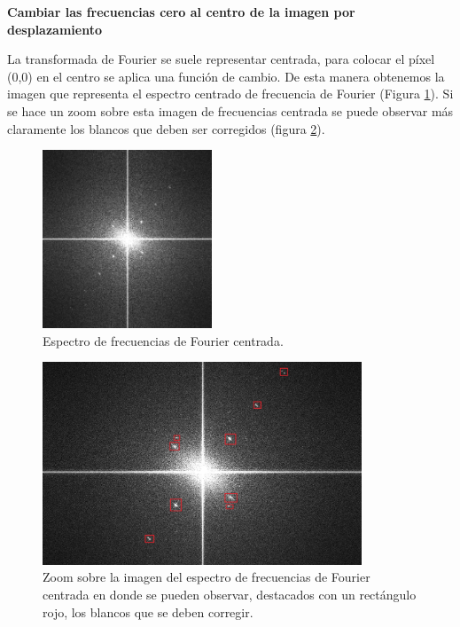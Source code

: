 \documentclass[10pt,a4paper, twoside]{report}
\begin{document}
\textbf{Cambiar las frecuencias cero al centro de la imagen por desplazamiento}

La transformada de Fourier se suele representar centrada, para colocar el píxel (0,0) en el centro se aplica una función de cambio. De esta manera obtenemos la imagen que representa el espectro centrado de frecuencia de Fourier (Figura \ref{FourierTransform}). Si se hace un zoom sobre esta imagen de frecuencias centrada se puede observar más claramente los blancos que deben ser corregidos (figura \ref{ZoomFourierTransformBlancos}).

\begin{figure}[!htb]
   \centering      
   \includegraphics[width=0.45\textwidth]{imagenes/FourierTransform.jpg}
 \caption{Espectro de frecuencias de Fourier centrada.}
 \label{FourierTransform}
\end{figure}

\begin{figure}[!htb]
   \centering      
   \includegraphics[width=0.85\textwidth]{imagenes/ZoomFourierTransformBlancos.jpg}
 \caption{Zoom sobre la imagen del espectro de frecuencias de Fourier centrada en donde se pueden observar, destacados con un rectángulo rojo, los blancos que se deben corregir.}
 \label{ZoomFourierTransformBlancos}
\end{figure}
\end{document}
